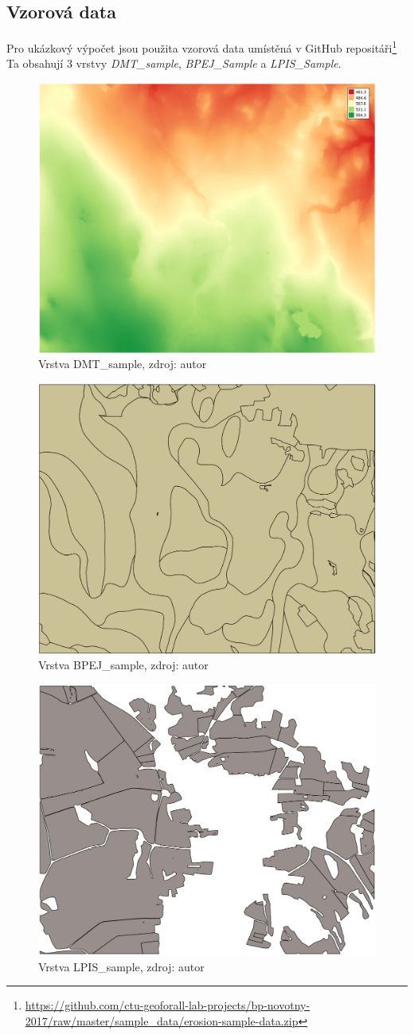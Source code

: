 \subsection{Vzorová data} Pro ukázkový výpočet jsou použita vzorová
data umístěná v GitHub repositáři\footnote{\url{https://github.com/ctu-geoforall-lab-projects/bp-novotny-2017/raw/master/sample_data/erosion-sample-data.zip}} Ta obsahují 3 vrstvy \textit{DMT\_sample}, \textit{BPEJ\_Sample}
a \textit{LPIS\_Sample}.
\begin{figure}[H] \centering
		\includegraphics[width=.4\textwidth]{./pictures/dmt_layer1.png}
		\caption[Vrstva DMT\_sample]{Vrstva DMT\_sample,
zdroj: autor}
		\label{dmt_sample}
\end{figure}
\begin{figure}[H] \centering
		\includegraphics[width=.4\textwidth]{./pictures/bpej_layer1.png}
		\caption[Vrstva BPEJ\_sample]{Vrstva BPEJ\_sample,
zdroj: autor}
		\label{bpej_sample}
\end{figure}
\begin{figure}[H] \centering
		\includegraphics[width=.4\textwidth]{./pictures/lpis_layer1.png}
		\caption[Vrstva LPIS\_sample]{Vrstva LPIS\_sample,
zdroj: autor}
		\label{lpis_sample}
\end{figure}

